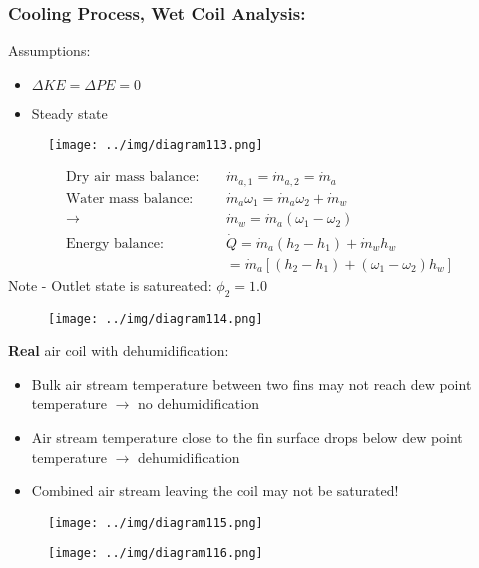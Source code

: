 \documentclass[class=report, crop=false, 12pt,a4paper]{standalone}
\numberwithin{equation}{section}
\begin{document}
\subsubsection{Cooling Process, Wet Coil Analysis:}
Assumptions:
\begin{itemize}[noitemsep]
  \item $\Delta KE = \Delta PE = 0$
  \item Steady state
\end{itemize}
\begin{figure}[H]
  \centering
  \texttt{[image: ../img/diagram113.png]}
  \caption{}
\end{figure}
\begin{align}
  \text{Dry air mass balance:} \ \ \ \ \ &\dot{m}_{a,1} = \dot{m}_{a,2} = \dot{m}_{a} \\[5pt]
  \text{Water mass balance:} \ \ \ \ \ &\dot{m}_{a}\omega_1 = \dot{m}_{a}\omega_2 + \dot{m}_{w} \\[5pt]
  \longrightarrow \ \ &\dot{m}_{w} = \dot{m}_{a}(\omega_1-\omega_2)\\[5pt]
  \text{Energy balance:} \ \ \ \ \ &\dot{Q} = \dot{m}_{a}(h_2-h_1) + \dot{m}_{w}h_{w} \\[5pt]
  &= \dot{m}_{a}\left[(h_2-h_1) + (\omega_1-\omega_2)h_{w}\right]
\end{align}
Note - Outlet state is satureated: $\phi_2 = 1.0$
\begin{figure}[H]
  \centering
  \texttt{[image: ../img/diagram114.png]}
  \caption{}
\end{figure}
\textbf{Real} air coil with dehumidification:
\begin{itemize}[noitemsep]
  \item Bulk air stream temperature between two fins may not reach dew point temperature $\longrightarrow$ no dehumidification
  \item Air stream temperature close to the fin surface drops below dew point temperature $\longrightarrow$ dehumidification
  \item Combined air stream leaving the coil may not be saturated!
\end{itemize}
\begin{figure}[H]
  \centering
  \texttt{[image: ../img/diagram115.png]}
  \caption{}
\end{figure}
\begin{figure}[H]
  \centering
  \texttt{[image: ../img/diagram116.png]}
  \caption{}
\end{figure}
\end{document}
